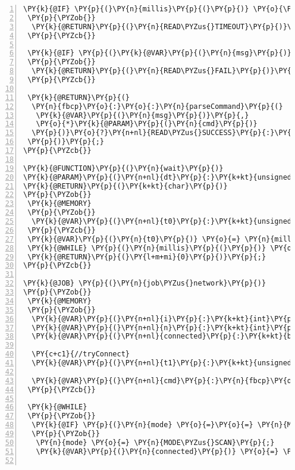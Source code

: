 \begin{Verbatim}[commandchars=\\\{\},numbers=left,firstnumber=1,stepnumber=1,frame=leftline,numbersep=0pt]
 \PY{k}{@IF} \PY{p}{(}\PY{n}{millis}\PY{p}{(}\PY{p}{)} \PY{o}{\PYZhy{}} \PY{k}{@VAR}\PY{p}{(}\PY{n}{t}\PY{p}{)} \PY{o}{\PYZgt{}}\PY{o}{=} \PY{k}{@PARAM}\PY{p}{(}\PY{n}{timeout}\PY{p}{)}\PY{p}{)}
 \PY{p}{\PYZob{}}
  \PY{k}{@RETURN}\PY{p}{(}\PY{n}{READ\PYZus{}TIMEOUT}\PY{p}{)}\PY{p}{;}
 \PY{p}{\PYZcb{}}
 
 \PY{k}{@IF} \PY{p}{(}\PY{k}{@VAR}\PY{p}{(}\PY{n}{msg}\PY{p}{)}\PY{p}{[}\PY{k}{@VAR}\PY{p}{(}\PY{n}{msg}\PY{p}{)}\PY{p}{.}\PY{n}{length}\PY{p}{(}\PY{p}{)}\PY{o}{\PYZhy{}}\PY{l+m+mi}{1}\PY{p}{]} \PY{o}{=}\PY{o}{=} \PY{l+s+sc}{\PYZsq{}\PYZbs{}0\PYZsq{}}\PY{p}{)}
 \PY{p}{\PYZob{}}
  \PY{k}{@RETURN}\PY{p}{(}\PY{n}{READ\PYZus{}FAIL}\PY{p}{)}\PY{p}{;}
 \PY{p}{\PYZcb{}}
 
 \PY{k}{@RETURN}\PY{p}{(}
  \PY{n}{fbcp}\PY{o}{:}\PY{o}{:}\PY{n}{parseCommand}\PY{p}{(}
   \PY{k}{@VAR}\PY{p}{(}\PY{n}{msg}\PY{p}{)}\PY{p}{,}
   \PY{o}{*}\PY{k}{@PARAM}\PY{p}{(}\PY{n}{cmd}\PY{p}{)}
  \PY{p}{)}\PY{o}{?}\PY{n+nl}{READ\PYZus{}SUCCESS}\PY{p}{:}\PY{n}{READ\PYZus{}FAIL}
 \PY{p}{)}\PY{p}{;}
\PY{p}{\PYZcb{}}

\PY{k}{@FUNCTION}\PY{p}{(}\PY{n}{wait}\PY{p}{)}
\PY{k}{@PARAM}\PY{p}{(}\PY{n+nl}{dt}\PY{p}{:}\PY{k+kt}{unsigned} \PY{k+kt}{int}\PY{p}{)}
\PY{k}{@RETURN}\PY{p}{(}\PY{k+kt}{char}\PY{p}{)}
\PY{p}{\PYZob{}}
 \PY{k}{@MEMORY}
 \PY{p}{\PYZob{}}
  \PY{k}{@VAR}\PY{p}{(}\PY{n+nl}{t0}\PY{p}{:}\PY{k+kt}{unsigned} \PY{k+kt}{int}\PY{p}{)}
 \PY{p}{\PYZcb{}}
 \PY{k}{@VAR}\PY{p}{(}\PY{n}{t0}\PY{p}{)} \PY{o}{=} \PY{n}{millis}\PY{p}{(}\PY{p}{)}\PY{p}{;}
 \PY{k}{@WHILE} \PY{p}{(}\PY{n}{millis}\PY{p}{(}\PY{p}{)} \PY{o}{\PYZhy{}} \PY{k}{@VAR}\PY{p}{(}\PY{n}{t0}\PY{p}{)} \PY{o}{\PYZlt{}} \PY{k}{@PARAM}\PY{p}{(}\PY{n}{dt}\PY{p}{)}\PY{p}{)} \PY{p}{\PYZob{}}\PY{p}{\PYZcb{}}
 \PY{k}{@RETURN}\PY{p}{(}\PY{l+m+mi}{0}\PY{p}{)}\PY{p}{;}
\PY{p}{\PYZcb{}}

\PY{k}{@JOB} \PY{p}{(}\PY{n}{job\PYZus{}network}\PY{p}{)}
\PY{p}{\PYZob{}}
 \PY{k}{@MEMORY}
 \PY{p}{\PYZob{}}
  \PY{k}{@VAR}\PY{p}{(}\PY{n+nl}{i}\PY{p}{:}\PY{k+kt}{int}\PY{p}{)}
  \PY{k}{@VAR}\PY{p}{(}\PY{n+nl}{n}\PY{p}{:}\PY{k+kt}{int}\PY{p}{)}
  \PY{k}{@VAR}\PY{p}{(}\PY{n+nl}{connected}\PY{p}{:}\PY{k+kt}{bool}\PY{p}{)}

  \PY{c+c1}{//tryConnect}
  \PY{k}{@VAR}\PY{p}{(}\PY{n+nl}{t1}\PY{p}{:}\PY{k+kt}{unsigned} \PY{k+kt}{long}\PY{p}{)}
  
  \PY{k}{@VAR}\PY{p}{(}\PY{n+nl}{cmd}\PY{p}{:}\PY{n}{fbcp}\PY{o}{:}\PY{o}{:}\PY{n}{COMMAND\PYZus{}LINE}\PY{p}{)}
 \PY{p}{\PYZcb{}}

 \PY{k}{@WHILE}
 \PY{p}{\PYZob{}}
  \PY{k}{@IF} \PY{p}{(}\PY{n}{mode} \PY{o}{=}\PY{o}{=} \PY{n}{MODE\PYZus{}IDLE}\PY{p}{)}
  \PY{p}{\PYZob{}}
   \PY{n}{mode} \PY{o}{=} \PY{n}{MODE\PYZus{}SCAN}\PY{p}{;}
   \PY{k}{@VAR}\PY{p}{(}\PY{n}{connected}\PY{p}{)} \PY{o}{=} \PY{n+nb}{false}\PY{p}{;}


\end{Verbatim}
